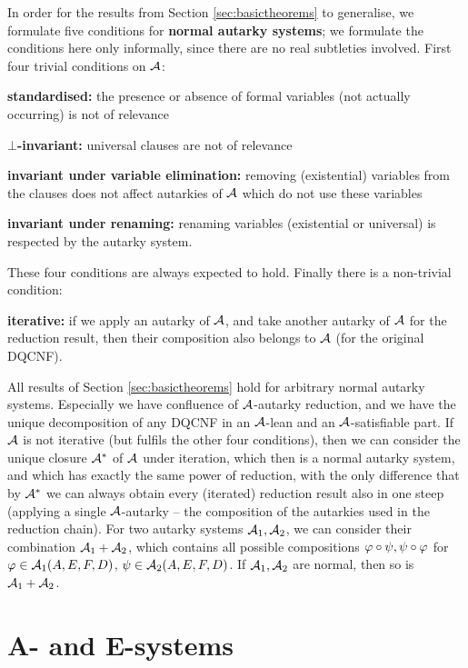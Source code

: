 \documentclass[conference]{IEEEtran}
\begin{document}
In order for the results from Section \ref{sec:basictheorems} to generalise, we formulate five conditions for \textbf{normal autarky systems}; we formulate the conditions here only informally, since there are no real subtleties involved. First four trivial conditions on $\mathcal{A}$:

\textbf{standardised:} the presence or absence of formal variables (not actually occurring) is not of relevance

\textbf{$\bot$-invariant:} universal clauses are not of relevance

\textbf{invariant under variable elimination:} removing (existential) variables from the clauses does not affect autarkies of $\mathcal{A}$ which do not use these variables

\textbf{invariant under renaming:} renaming variables (existential or universal) is respected by the autarky system.

These four conditions are always expected to hold. Finally there is a non-trivial condition:

\textbf{iterative:} if we apply an autarky of $\mathcal{A}$, and take another autarky of $\mathcal{A}$ for the reduction result, then their composition also belongs to $\mathcal{A}$ (for the original DQCNF).

All results of Section \ref{sec:basictheorems} hold for arbitrary normal autarky systems.
Especially we have confluence of $\mathcal{A}$-autarky reduction, and we have the unique decomposition of any DQCNF in an $\mathcal{A}$-lean and an $\mathcal{A}$-satisfiable part.
If $\mathcal{A}$ is not iterative (but fulfils the other four conditions), then we can consider the unique closure $\mathcal{A}^*$ of $\mathcal{A}$ under iteration, which then is a normal autarky system, and which has exactly the same power of reduction, with the only difference that by $\mathcal{A}^*$ we can always obtain every (iterated) reduction result also in one steep (applying a single $\mathcal{A}$-autarky -- the composition of the autarkies used in the reduction chain).
For two autarky systems $\mathcal{A}_1, \mathcal{A}_2$, we can consider their combination $\mathcal{A}_1 + \mathcal{A}_2$, which contains all possible compositions $\varphi \circ \psi, \psi \circ \varphi$ for $\varphi \in \mathcal{A}_1(A,E,F,D)$, $\psi \in \mathcal{A}_2(A,E,F,D)$. If $\mathcal{A}_1, \mathcal{A}_2$ are normal, then so is $\mathcal{A}_1 + \mathcal{A}_2$.



\section{A- and E-systems}
\label{sec:AEsystems}
\end{document}
